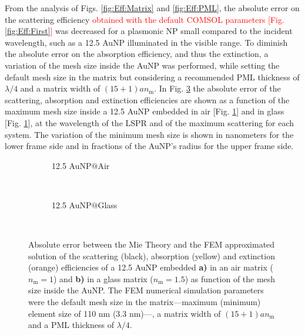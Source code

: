 From the analysis of Figs. \ref{fig:Eff:Matrix} and \ref{fig:Eff:PML}, the absolute error on the scattering efficiency \textcolor{red}{obtained with the default COMSOL parameters [Fig. \ref{fig:Eff:First}]} was decreased for a plasmonic NP small compared to the incident wavelength, such as a 12.5 AuNP illuminated in the visible range. To diminish the absolute error on the absorption efficiency, and thus the extinction, a variation of the mesh size inside the AuNP was performed, while setting the default mesh size in the matrix but considering a recommended PML thickness of $\lambda/4$ and a matrix width of $(15+1)an_\text{m}$. In Fig. \ref{fig:Eff:rad} the absolute error of the scattering, absorption and extinction efficiencies are shown as a function  of the maximum mesh size inside a 12.5 AuNP embedded in air [Fig. \ref{fig:Eff:rad:a}] and in glass [Fig. \ref{fig:Eff:rad:a}], at the wavelength of the LSPR and of the maximum scattering for each system. The variation of the minimum mesh size is shown in nanometers for the lower frame side and  in fractions of the AuNP's radius for the upper frame side.

\begin{figure}[h!]
	\centering
	\def\svgwidth{.9\textwidth}
	\small
	\hspace*{-.45\textwidth}
	 \begin{subfigure}{\textwidth}\caption{12.5 AuNP$@$Air}\label{fig:Eff:rad:a}\end{subfigure}\\[5.5em]
		 \hspace*{-.45\textwidth}
	      \begin{subfigure}{\textwidth}\caption{12.5 AuNP$@$Glass}\label{fig:Eff:rad:b}\end{subfigure}\\[-10.1em]
\caption[Scattering, Absorption and Extinction Efficiencies absolute error: meshing size inside AuNP analysis ]{Absolute error between the Mie Theory and the FEM approximated solution of the scattering (black), absorption (yellow) and extinction (orange) efficiencies of a 12.5 AuNP embedded \textbf{a)} in an air matrix ($n_\text{m} = 1$) and \textbf{b)} in a glass matrix ($n_\text{m} = 1.5$) as function of the mesh size inside the AuNP. The FEM numerical simulation parameters were the default mesh size  in the matrix---maximum (minimum) element size of 110 nm (3.3 nm)---, a matrix width of $(15+1) a n_\text{m}$ and a PML thickness of $\lambda/4$.}
\label{fig:Eff:rad}
\end{figure}

